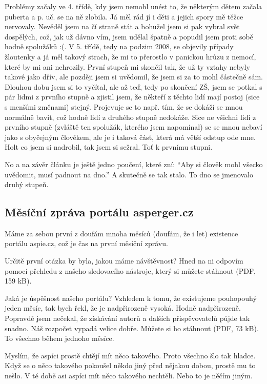 \documentclass[DIV=calc, paper=a4, fontsize=11pt, twocolumn]{scrartcl}	 %
\begin{document}
Problémy začaly ve 4. třídě, kdy jsem nemohl unést to, že některým
dětem začala puberta a p. uč. se na ně zlobila. Já měl rád jí i děti a
jejich spory mě těžce nervovaly. Nevěděl jsem na čí straně stát a
bohužel jsem si pak vybral svět dospělých, což, jak už dávno vím, jsem
udělal špatně a popudil jsem proti sobě hodně spolužáků :(. V
5. třídě, tedy na podzim 2008, se objevily případy žloutenky a já měl
takový strach, že mi to přerostlo v panickou hrůzu z nemocí, které by
mi ani nehrozily. První stupeň mi skončil tak, že už ty vztahy nebyly
takové jako dřív, ale později jsem si uvědomil, že jsem si za to mohl
částečně sám. Dlouhou dobu jsem si to vyčítal, ale až teď, tedy po
skončení ZŠ, jsem se potkal s pár lidmi z prvního stupně a zjistil
jsem, že někteří z těchto lidí mají postoj (sice s menšími změnami)
stejný. Projevuje se to např. tím, že se dokáží se mnou normálně
bavit, což hodně lidí z druhého stupně nedokáže. Sice ne všichni lidi
z prvního stupně (zvláště ten spolužák, kterého jsem napomínal) se se
mnou nebaví jako s obyčejným člověkem, ale je i taková část, která má
větší odstup ode mne. Holt co jsem si nadrobil, tak jsem si
sežral. Toť k prvnímu stupni.

No a na závěr článku je ještě jedno poučení, které zní: “Aby si člověk
mohl všecko uvědomit, musí padnout na dno.” A skutečně se tak
stalo. To dno se jmenovalo druhý stupeň.

 
\subsection*{Měsíční zpráva portálu asperger.cz}


Máme za sebou první z doufám mnoha měsíců (doufám, že i let) existence
portálu aspie.cz, což je čas na první měsíční zprávu.

Určitě první otázka by byla, jakou máme návštěvnost? Hned na ni
odpovím pomocí přehledu z našeho sledovacího nástroje, který si můžete
stáhnout (PDF, 159 kB).

Jaká je úspěšnost našeho portálu? Vzhledem k tomu, že existujeme
pouhopouhý jeden měsíc, tak bych řekl, že je nadpřirozeně
vysoká. Hodně nadpřirozeně. Popravdě jsem nečekal, že získávání autorů
a dalších přispěvovatelů půjde tak snadno. Náš rozpočet vypadá velice
dobře. Můžete si ho stáhnout (PDF, 73 kB). To všechno během jednoho
měsíce.

Myslím, že aspíci prostě chtějí mít něco takového. Proto všechno šlo
tak hladce. Když se o něco takového pokoušel někdo jiný před nějakou
dobou, prostě mu to nešlo. V té době asi aspíci mít něco takového
nechtěli. Nebo to je něčím jiným.
\end{document}
